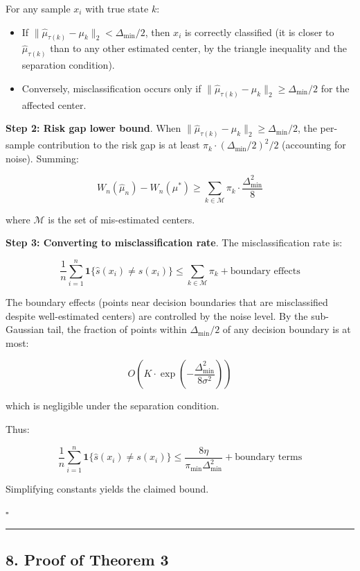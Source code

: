 \documentclass[
  12pt,
]{article}
\providecommand{\tightlist}{%
  \setlength{\itemsep}{0pt}\setlength{\parskip}{0pt}}
\begin{document}
For any sample \(x_i\) with true state \(k\):

\begin{itemize}
\tightlist
\item
  If \(\|\hat{\mu}_{\tau(k)} - \mu_k\|_2 < \Delta_{\min}/2\), then
  \(x_i\) is correctly classified (it is closer to
  \(\hat{\mu}_{\tau(k)}\) than to any other estimated center, by the
  triangle inequality and the separation condition).
\item
  Conversely, misclassification occurs only if
  \(\|\hat{\mu}_{\tau(k)} - \mu_k\|_2 \geq \Delta_{\min}/2\) for the
  affected center.
\end{itemize}

\textbf{Step 2: Risk gap lower bound}. When
\(\|\hat{\mu}_{\tau(k)} - \mu_k\|_2 \geq \Delta_{\min}/2\), the
per-sample contribution to the risk gap is at least
\(\pi_k \cdot (\Delta_{\min}/2)^2 / 2\) (accounting for noise). Summing:

\[W_n(\hat{\mu}_n) - W_n(\mu^*) \geq \sum_{k \in \mathcal{M}} \pi_k \cdot \frac{\Delta_{\min}^2}{8}\]

where \(\mathcal{M}\) is the set of mis-estimated centers.

\textbf{Step 3: Converting to misclassification rate}. The
misclassification rate is:

\[\frac{1}{n} \sum_{i=1}^n \mathbf{1}\{\hat{s}(x_i) \neq s(x_i)\} \leq \sum_{k \in \mathcal{M}} \pi_k + \text{boundary effects}\]

The boundary effects (points near decision boundaries that are
misclassified despite well-estimated centers) are controlled by the
noise level. By the sub-Gaussian tail, the fraction of points within
\(\Delta_{\min}/2\) of any decision boundary is at most:

\[O\left(K \cdot \exp\left(-\frac{\Delta_{\min}^2}{8\sigma^2}\right)\right)\]

which is negligible under the separation condition.

Thus:

\[\frac{1}{n} \sum_{i=1}^n \mathbf{1}\{\hat{s}(x_i) \neq s(x_i)\} \leq \frac{8\eta}{\pi_{\min} \Delta_{\min}^2} + \text{boundary terms}\]

Simplifying constants yields the claimed bound.

\(\square\)

\begin{center}\rule{0.5\linewidth}{0.5pt}\end{center}

\subsection{8. Proof of Theorem 3}\label{proof-of-theorem-3}
\end{document}
